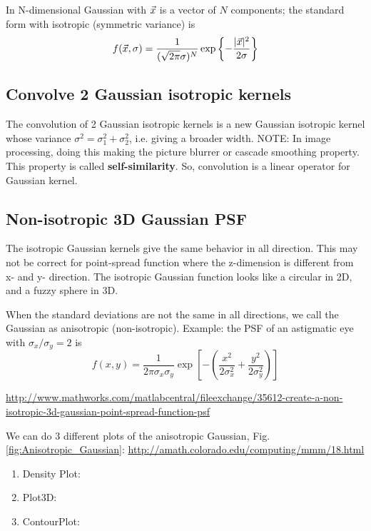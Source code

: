 In N-dimensional Gaussian with $\vec{x}$ is a vector of $N$ components; the
standard form with isotropic (symmetric variance) is
\begin{equation}
f(\vec{x},\sigma) = \frac{1}{(\sqrt{2\pi}\sigma)^N}\exp\left\{
-\frac{|\vec{x}|^2}{2\sigma} \right\}
\end{equation}


\subsection{Convolve 2 Gaussian isotropic kernels}

The convolution of 2 Gaussian isotropic kernels is a new Gaussian isotropic
kernel whose variance $\sigma^2 = \sigma_1^2 + \sigma_2^2$, i.e. giving a
broader width. NOTE: In image processing, doing this making the picture blurrer
or cascade smoothing property.
This property is called {\bf self-similarity}. So, convolution is a linear
operator for Gaussian kernel.

\subsection{Non-isotropic 3D Gaussian PSF}

The isotropic Gaussian kernels give the same behavior in all direction. This may
not be correct for point-spread function where the z-dimension is different from
x- and y- direction. The isotropic Gaussian function looks like a circular in
2D, and a fuzzy sphere in 3D. 

When the standard deviations are not the same in all directions, we call the
Gaussian as anisotropic (non-isotropic). Example: the PSF of an astigmatic eye
with $\sigma_x/\sigma_y=2$ is
\begin{equation}
f(x,y) = \frac{1}{2\pi\sigma_x\sigma_y}\exp\left[ -\left(
\frac{x^2}{2\sigma_x^2} + \frac{y^2}{2\sigma_y^2} \right) \right]
\end{equation}

\url{http://www.mathworks.com/matlabcentral/fileexchange/35612-create-a-non-isotropic-3d-gaussian-point-spread-function-psf}

We can do 3 different plots of the anisotropic Gaussian,
Fig.\ref{fig:Anisotropic_Gaussian}:
\url{http://amath.colorado.edu/computing/mmm/18.html}
\begin{enumerate}
  \item Density Plot:
  \item Plot3D:
  \item ContourPlot: 
\end{enumerate}

